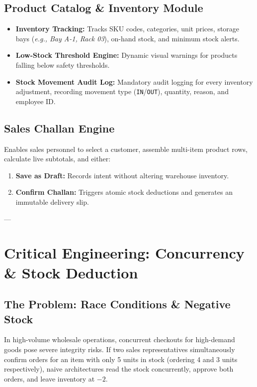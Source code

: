 \documentclass[11pt,a4paper]{article}
\begin{document}
\subsection{Product Catalog \& Inventory Module}
\begin{itemize}[itemsep=0.3em]
    \item \textbf{Inventory Tracking:} Tracks SKU codes, categories, unit prices, storage bays (\textit{e.g., Bay A-1, Rack 03}), on-hand stock, and minimum stock alerts.
    \item \textbf{Low-Stock Threshold Engine:} Dynamic visual warnings for products falling below safety thresholds.
    \item \textbf{Stock Movement Audit Log:} Mandatory audit logging for every inventory adjustment, recording movement type (\texttt{IN}/\texttt{OUT}), quantity, reason, and employee ID.
\end{itemize}

\subsection{Sales Challan Engine}
Enables sales personnel to select a customer, assemble multi-item product rows, calculate live subtotals, and either:
\begin{enumerate}[itemsep=0.2em]
    \item \textbf{Save as Draft:} Records intent without altering warehouse inventory.
    \item \textbf{Confirm Challan:} Triggers atomic stock deductions and generates an immutable delivery slip.
\end{enumerate}

---

\section{Critical Engineering: Concurrency \& Stock Deduction}

\subsection{The Problem: Race Conditions \& Negative Stock}
In high-volume wholesale operations, concurrent checkouts for high-demand goods pose severe integrity risks. If two sales representatives simultaneously confirm orders for an item with only 5 units in stock (ordering 4 and 3 units respectively), naive architectures read the stock concurrently, approve both orders, and leave inventory at $-2$.
\end{document}
